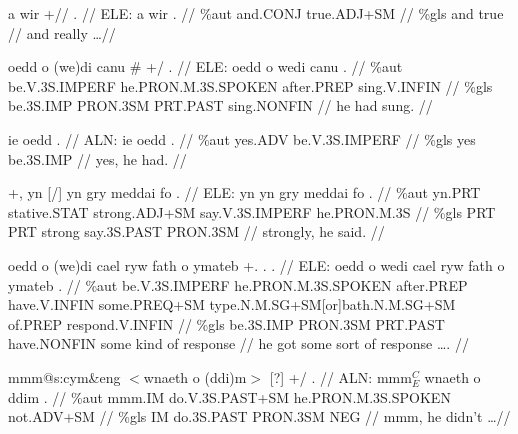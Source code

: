 \documentclass[a4paper,10pt]{article}
\begin{document}
\ex
\begingl[lingstyle=gergl]
\glchat a wir +// . //
\glsurface ELE:  a wir .  //
\glauto \%aut  and{\scriptsize .CONJ} true{\scriptsize .ADJ+SM}   //
\glmanual \%gls  and true   //
\gleng and really \dots  //
\endgl
\xe

\ex
\begingl[lingstyle=gergl]
\glchat oedd o (we)di canu \# +/ . //
\glsurface ELE:  oedd o wedi canu .  //
\glauto \%aut  be{\scriptsize .V.3S.IMPERF} he{\scriptsize .PRON.M.3S.SPOKEN} after{\scriptsize .PREP} sing{\scriptsize .V.INFIN}   //
\glmanual \%gls  be{\scriptsize .3S.IMP} PRON{\scriptsize .3SM} PRT{\scriptsize .PAST} sing{\scriptsize .NONFIN}   //
\gleng he had sung. //
\endgl
\xe

\ex
\begingl[lingstyle=gergl]
\glchat ie oedd . //
\glsurface ALN:  ie oedd .  //
\glauto \%aut  yes{\scriptsize .ADV} be{\scriptsize .V.3S.IMPERF}   //
\glmanual \%gls  yes be{\scriptsize .3S.IMP}   //
\gleng yes, he had. //
\endgl
\xe

\ex
\begingl[lingstyle=gergl]
\glchat +, yn [/] yn gry meddai fo . //
\glsurface ELE:  yn yn gry meddai fo .  //
\glauto \%aut  yn{\scriptsize .PRT} stative{\scriptsize .STAT} strong{\scriptsize .ADJ+SM} say{\scriptsize .V.3S.IMPERF} he{\scriptsize .PRON.M.3S}   //
\glmanual \%gls  PRT PRT strong say{\scriptsize .3S.PAST} PRON{\scriptsize .3SM}   //
\gleng strongly, he said. //
\endgl
\xe

\ex
\begingl[lingstyle=gergl]
\glchat oedd o (we)di cael ryw fath o ymateb +. . . //
\glsurface ELE:  oedd o wedi cael ryw fath o ymateb .  //
\glauto \%aut  be{\scriptsize .V.3S.IMPERF} he{\scriptsize .PRON.M.3S.SPOKEN} after{\scriptsize .PREP} have{\scriptsize .V.INFIN} some{\scriptsize .PREQ+SM} type{\scriptsize .N.M.SG+SM[or]bath.N.M.SG+SM} of{\scriptsize .PREP} respond{\scriptsize .V.INFIN}   //
\glmanual \%gls  be{\scriptsize .3S.IMP} PRON{\scriptsize .3SM} PRT{\scriptsize .PAST} have{\scriptsize .NONFIN} some kind of response   //
\gleng he got some sort of response \dots . //
\endgl
\xe

\ex
\begingl[lingstyle=gergl]
\glchat mmm@s:cym\&eng $<$wnaeth o (ddi)m$>$ [?] +/ . //
\glsurface ALN:  mmm$^{C}_{E}$ wnaeth o ddim .  //
\glauto \%aut  mmm{\scriptsize .IM} do{\scriptsize .V.3S.PAST+SM} he{\scriptsize .PRON.M.3S.SPOKEN} not{\scriptsize .ADV+SM}   //
\glmanual \%gls  IM do{\scriptsize .3S.PAST} PRON{\scriptsize .3SM} NEG   //
\gleng mmm, he didn't \dots  //
\endgl
\xe
\end{document}
